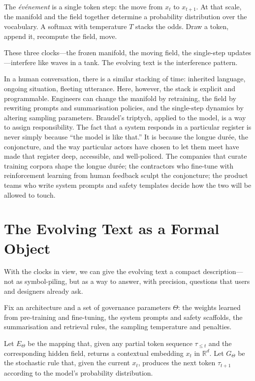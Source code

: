 \documentclass[12pt,a4paper]{report}
\begin{document}
The \emph{événement} is a single token step: the move from $x_t$ to $x_{t+1}$. At that scale, the manifold and the field together determine a probability distribution over the vocabulary. A softmax with temperature $T$ stacks the odds. Draw a token, append it, recompute the field, move.

These three clocks---the frozen manifold, the moving field, the single-step updates---interfere like waves in a tank. The evolving text is the interference pattern.

In a human conversation, there is a similar stacking of time: inherited language, ongoing situation, fleeting utterance. Here, however, the stack is explicit and programmable. Engineers can change the manifold by retraining, the field by rewriting prompts and summarisation policies, and the single-step dynamics by altering sampling parameters. Braudel's triptych, applied to the model, is a way to assign responsibility. The fact that a system responds in a particular register is never simply because ``the model is like that.'' It is because the longue durée, the conjoncture, and the way particular actors have chosen to let them meet have made that register deep, accessible, and well-policed. The companies that curate training corpora shape the longue durée; the contractors who fine-tune with reinforcement learning from human feedback sculpt the conjoncture; the product teams who write system prompts and safety templates decide how the two will be allowed to touch.

\section{The Evolving Text as a Formal Object}

With the clocks in view, we can give the evolving text a compact description---not as symbol-piling, but as a way to answer, with precision, questions that users and designers already ask.

Fix an architecture and a set of governance parameters $\Theta$: the weights learned from pre-training and fine-tuning, the system prompts and safety scaffolds, the summarisation and retrieval rules, the sampling temperature and penalties.

Let $E_\Theta$ be the mapping that, given any partial token sequence $\tau_{\leq t}$ and the corresponding hidden field, returns a contextual embedding $x_t$ in $\mathbb{R}^d$. Let $G_\Theta$ be the stochastic rule that, given the current $x_t$, produces the next token $\tau_{t+1}$ according to the model's probability distribution.
\end{document}
